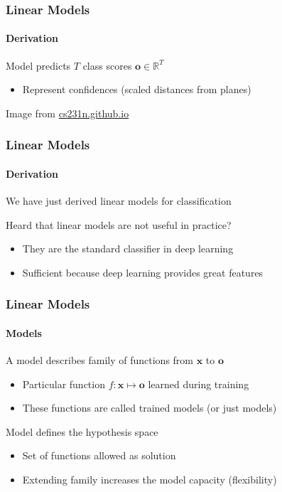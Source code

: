 \documentclass[xetex,professionalfont]{beamer}
\renewcommand\emph[1]{\textcolor{tuwcvl_cvl_blue}{#1}}
\newcommand{\RR}{\mathbb{R}}
\renewcommand{\vec}[1]{\ensuremath{\mathbf{#1}}}
\newcommand{\vx}{\vec{x}}
\newcommand{\vo}{\vec{o}}
\begin{document}
\begin{frame}
  \frametitle{Linear Models}
  \framesubtitle{Derivation}

Model predicts $T$ \emph{class scores} $\vo\in\RR^T$
\begin{itemize}
    \item Represent confidences (scaled distances from planes)
\end{itemize}

\medskip

\begin{center}
    {\centering Image from \href{http://cs231n.github.io/}{cs231n.github.io}}
\end{center}

\end{frame}


\begin{frame}
  \frametitle{Linear Models}
  \framesubtitle{Derivation}

We have just derived \emph{linear models} for classification

\bigskip

Heard that linear models are not useful in practice?
\begin{itemize}
    \item They are the standard classifier in deep learning
    \item Sufficient because deep learning provides great features
\end{itemize}

\end{frame}


\begin{frame}
  \frametitle{Linear Models}
  \framesubtitle{Models}

A \emph{model} describes family of functions from $\vx$ to $\vo$ %
\begin{itemize}
    \item Particular function $f:\vx\mapsto\vo$ learned during training
    \item These functions are called trained models (or just models)
\end{itemize}

\bigskip

Model defines the \emph{hypothesis space}
\begin{itemize}
    \item Set of functions allowed as solution
    \item Extending family increases the model \emph{capacity} (flexibility) %
\end{itemize}

\end{frame}
\end{document}
